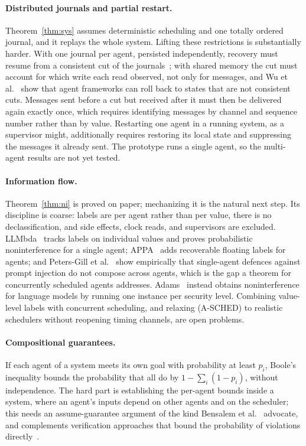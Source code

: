 \paragraph{Distributed journals and partial restart.}
Theorem~\ref{thm:sys} assumes deterministic scheduling and one totally ordered journal, and it
replays the whole system.
Lifting these restrictions is substantially harder.
With one journal per agent, persisted independently, recovery must resume from a consistent cut
of the journals~\citep{chandy1985snapshots}; with shared memory the cut must account for which
write each read observed, not only for messages, and Wu et al.~\citep{wu2026safetoresume} show
that agent frameworks can roll back to states that are not consistent cuts.
Messages sent before a cut but received after it must then be delivered again exactly once,
which requires identifying messages by channel and sequence number rather than by value.
Restarting one agent in a running system, as a supervisor might, additionally requires
restoring its local state and suppressing the messages it already sent.
The prototype runs a single agent, so the multi-agent results are not yet tested.

\paragraph{Information flow.}
Theorem~\ref{thm:ni} is proved on paper; mechanizing it is the natural next step.
Its discipline is coarse: labels are per agent rather than per value, there is no
declassification, and side effects, clock reads, and supervisors are excluded.
LLMbda~\citep{garby2026llmbda} tracks labels on individual values and proves probabilistic
noninterference for a single agent; APPA~\citep{kravchenko2026appa} adds recoverable floating
labels for agents; and Peters-Gill et al.~\citep{petersgill2026camels} show empirically that
single-agent defences against prompt injection do not compose across agents, which is the gap a
theorem for concurrently scheduled agents addresses.
Adams~\citep{adams2026sme} instead obtains noninterference for language models by running one
instance per security level.
Combining value-level labels with concurrent scheduling, and relaxing (A-SCHED) to realistic
schedulers without reopening timing channels, are open problems.

\paragraph{Compositional guarantees.}
If each agent of a system meets its own goal with probability at least $p_i$, Boole's
inequality bounds the probability that all do by $1 - \sum_i (1 - p_i)$, without independence.
The hard part is establishing the per-agent bounds inside a system, where an agent's inputs
depend on other agents and on the scheduler; this needs an assume-guarantee argument of the
kind Bensalem et al.~\citep{bensalem2026threelayer} advocate, and complements verification
approaches that bound the probability of violations directly~\citep{solkobreslin2026probverif}.
